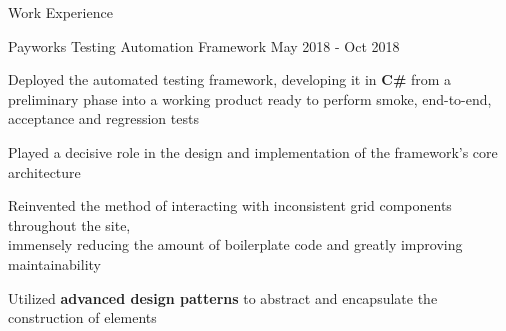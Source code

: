 \documentclass{resume} %
\begin{document}
\begin{rSection}{Work Experience}
    \begin{workexperience}
        {Payworks}
        {Testing Automation Framework}
        {May 2018 - Oct 2018}
        {
            \item Deployed the automated testing framework, developing it in \textbf{C\#} from a preliminary phase into a working product ready to perform smoke, end-to-end, acceptance and regression tests
            \item Played a decisive role in the design and implementation of the framework's core architecture
            \item Reinvented the method of interacting with inconsistent grid components throughout the site, \\immensely reducing the amount of boilerplate code and greatly improving maintainability
            \item Utilized \textbf{advanced design patterns} to abstract and encapsulate the construction of elements
        }
    \end{workexperience}

    \vspace{1em}

\end{rSection}


\pagebreak
\end{document}
